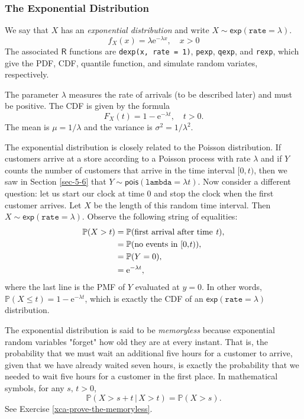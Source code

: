 \subsubsection{The Exponential Distribution}
\label{sec-6-5-1-1}

We say that \(X\) has an \emph{exponential distribution} and write
\(X\sim\mathsf{exp}(\mathtt{rate}=\lambda)\).
\begin{equation}
f_{X}(x)=\lambda\mathrm{e}^{-\lambda x},\quad x>0
\end{equation}
The associated \(\mathsf{R}\) functions are \texttt{dexp(x, rate = 1)},
\texttt{pexp}, \texttt{qexp}, and \texttt{rexp}, which give the PDF, CDF, quantile
function, and simulate random variates, respectively.

The parameter \(\lambda\) measures the rate of arrivals (to be
described later) and must be positive. The CDF is given by the formula
\begin{equation}
F_{X}(t)=1-\mathrm{e}^{-\lambda t},\quad t>0.
\end{equation}
The mean is \(\mu=1/\lambda\) and the variance is
\(\sigma^{2}=1/\lambda^{2}\).

The exponential distribution is closely related to the Poisson
distribution. If customers arrive at a store according to a Poisson
process with rate \(\lambda\) and if \(Y\) counts the number of
customers that arrive in the time interval \([0,t)\), then we saw in
Section \ref{sec-5-6} that \( Y \sim
\mathsf{pois}(\mathtt{lambda}=\lambda t). \) Now consider a different
question: let us start our clock at time 0 and stop the clock when the
first customer arrives. Let \(X\) be the length of this random time
interval. Then \(X\sim\mathsf{exp}(\mathtt{rate}=\lambda)\). Observe
the following string of equalities:
\begin{align*}
\mathbb{P}(X>t) & =\mathbb{P}(\mbox{first arrival after time \emph{t}}),\\
 & =\mathbb{P}(\mbox{no events in [0,\emph{t})}),\\
 & =\mathbb{P}(Y=0),\\
 & =\mathrm{e}^{-\lambda t},
\end{align*}
where the last line is the PMF of \(Y\) evaluated at \(y=0\). In other
words, \(\mathbb{P}(X\leq t)=1-\mathrm{e}^{-\lambda t}\), which is
exactly the CDF of an \(\mathsf{exp}(\mathtt{rate}=\lambda)\)
distribution.

The exponential distribution is said to be \emph{memoryless} because
exponential random variables "forget" how old they are at every
instant. That is, the probability that we must wait an additional five
hours for a customer to arrive, given that we have already waited
seven hours, is exactly the probability that we needed to wait five
hours for a customer in the first place. In mathematical symbols, for
any \(s,\, t>0\),
\begin{equation}
\mathbb{P}(X>s+t\,|\, X>t)=\mathbb{P}(X>s).
\end{equation}
See Exercise \ref{xca-prove-the-memoryless}.

